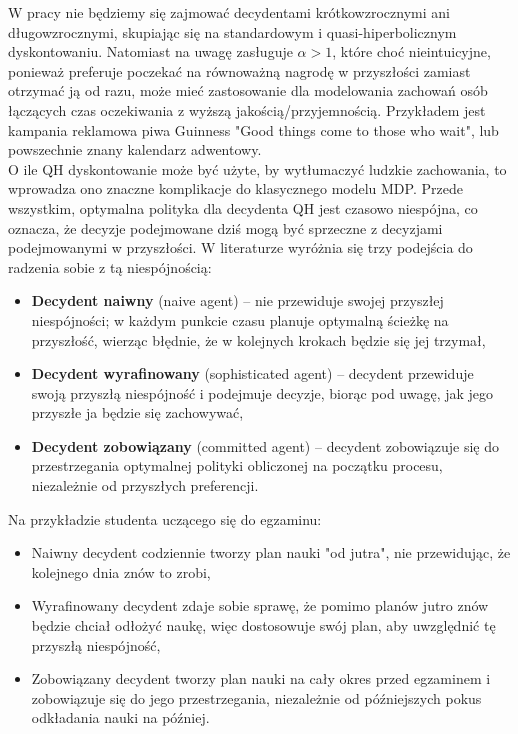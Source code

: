 W pracy nie będziemy się zajmować decydentami krótkowzrocznymi ani długowzrocznymi, skupiając się na standardowym i quasi-hiperbolicznym dyskontowaniu. Natomiast na uwagę zasługuje $\alpha > 1$, które choć nieintuicyjne, ponieważ preferuje poczekać na równoważną nagrodę w przyszłości zamiast otrzymać ją od razu, może mieć zastosowanie dla modelowania zachowań osób łączących czas oczekiwania z wyższą jakością/przyjemnością. Przykładem jest kampania reklamowa piwa Guinness "Good things come to those who wait", lub powszechnie znany kalendarz adwentowy. \\
O ile QH dyskontowanie może być użyte, by wytłumaczyć ludzkie zachowania, to wprowadza ono znaczne komplikacje do klasycznego modelu MDP. Przede wszystkim, optymalna polityka dla decydenta QH jest czasowo niespójna, co oznacza, że decyzje podejmowane dziś mogą być sprzeczne z decyzjami podejmowanymi w przyszłości. W literaturze wyróżnia się trzy podejścia do radzenia sobie z tą niespójnością:
\begin{itemize}
	\item \textbf{Decydent naiwny} (naive agent) -- nie przewiduje swojej przyszłej niespójności; w każdym punkcie czasu planuje optymalną ścieżkę na przyszłość, wierząc błędnie, że w kolejnych krokach będzie się jej trzymał,
	\item \textbf{Decydent wyrafinowany} (sophisticated agent) -- decydent przewiduje swoją przyszłą niespójność i podejmuje decyzje, biorąc pod uwagę, jak jego przyszłe ja będzie się zachowywać,
	\item \textbf{Decydent zobowiązany} (committed agent) -- decydent zobowiązuje się do przestrzegania optymalnej polityki obliczonej na początku procesu, niezależnie od przyszłych preferencji.
\end{itemize}
Na przykładzie studenta uczącego się do egzaminu:
\begin{itemize}
	\item Naiwny decydent codziennie tworzy plan nauki "od jutra", nie przewidując, że kolejnego dnia znów to zrobi,
	\item Wyrafinowany decydent zdaje sobie sprawę, że pomimo planów jutro znów będzie chciał odłożyć naukę, więc dostosowuje swój plan, aby uwzględnić tę przyszłą niespójność,
	\item Zobowiązany decydent tworzy plan nauki na cały okres przed egzaminem i zobowiązuje się do jego przestrzegania, niezależnie od późniejszych pokus odkładania nauki na później.
\end{itemize}

